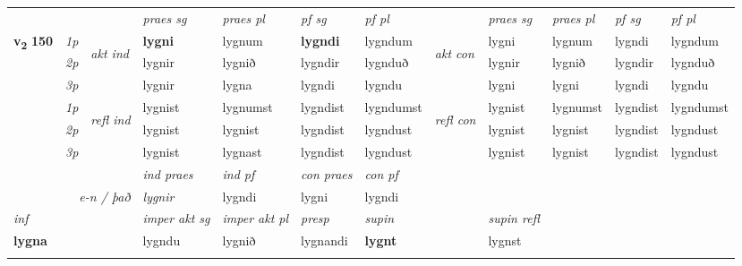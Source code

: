 \begin{longtable}[l]{X>{\footnotesize\itshape}llXXXXlXXXX}
 & &   & \textit{praes sg}  & \textit{praes pl}    & \textit{ pf sg} & \textit{pf pl} & & \textit{praes sg}  & \textit{praes pl}    & \textit{pf sg} & \textit{pf pl }  \\ \cmidrule{4-7} \cmidrule{9-12}
 \multirow{2}{*}{{{\textbf{v{\textsubscript{2}}} \Large{\textbf{150}}}}}  & 1p & \multirow{3}{*}{\begin{turn}{90}\textit{akt ind}\end{turn}} & \textbf{lygni} & lygnum & \textbf{lygndi} & lygndum & \multirow{3}{*}{\begin{turn}{90}\textit{akt con}\end{turn}} &lygni & lygnum & lygndi & lygndum\\*
 & 2p &  &  lygnir  & lygnið & lygndir & lygnduð & & lygnir & lygnið & lygndir & lygnduð \\*
 & 3p &  & lygnir & lygna & lygndi & lygndu & & lygni & lygni& lygndi & lygndu \\*
\cmidrule{4-7} \cmidrule{9-12}
 & 1p & \multirow{3}{*}{\begin{turn}{90}\textit{refl ind}\end{turn}}  & lygnist & lygnumst & lygndist & lygndumst & \multirow{3}{*}{\begin{turn}{90}\textit{refl con}\end{turn}}  &lygnist & lygnumst & lygndist & lygndumst \\*
 & 2p &  & lygnist & lygnist & lygndist & lygndust & &lygnist & lygnist & lygndist & lygndust \\*
 & 3p  & & lygnist & lygnast & lygndist & lygndust & & lygnist & lygnist& lygndist & lygndust \\*
\cmidrule{4-7} \cmidrule{9-12}

   && &  \textit{ind praes} & \textit{ind pf} & \textit{con praes} & \textit{con pf} \\*
\multicolumn{3}{r}{\textit{e-n / það}} & lygnir & lygndi & lygni & lygndi \\*

\cmidrule{4-7}
   {\textit{inf}} & &  & \textit{imper akt sg} & \textit{imper akt pl}   & \textit{presp} & \textit{supin} && \textit{supin refl}  \\*
  {\textbf{lygna}} & && lygndu  & lygnið   & lygnandi &  \textbf{lygnt} && lygnst  \\*

\midrule
  & \\
   \midrule


\end{longtable}
